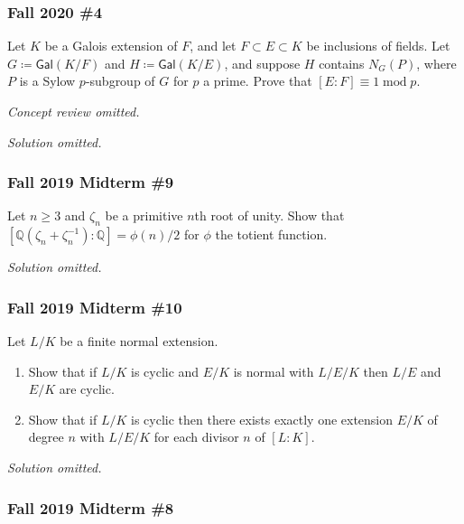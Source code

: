 \hypertarget{fall-2020-4}{%
\subsubsection{Fall 2020 \#4}\label{fall-2020-4}}

Let \(K\) be a Galois extension of \(F\), and let
\(F \subset E \subset K\) be inclusions of fields. Let
\(G \coloneqq{ \mathsf{Gal}} (K/F)\) and
\(H \coloneqq{ \mathsf{Gal}} (K/E)\), and suppose \(H\) contains
\(N_G(P)\), where \(P\) is a Sylow \(p\)-subgroup of \(G\) for \(p\) a
prime. Prove that \([E: F] \equiv 1 \operatorname{mod}p\).

\emph{Concept review omitted.}

\emph{Solution omitted.}

\hypertarget{fall-2019-midterm-9}{%
\subsubsection{Fall 2019 Midterm \#9}\label{fall-2019-midterm-9}}

Let \(n\geq 3\) and \(\zeta_n\) be a primitive \(n\)th root of unity.
Show that
\([{\mathbb{Q}}(\zeta_n + \zeta_n^{-1}): {\mathbb{Q}}] = \phi(n)/2\) for
\(\phi\) the totient function.

\emph{Solution omitted.}

\hypertarget{fall-2019-midterm-10}{%
\subsubsection{Fall 2019 Midterm \#10}\label{fall-2019-midterm-10}}

Let \(L/K\) be a finite normal extension.

\begin{enumerate}
\def\labelenumi{\alph{enumi}.}
\item
  Show that if \(L/K\) is cyclic and \(E/K\) is normal with \(L/E/K\)
  then \(L/E\) and \(E/K\) are cyclic.
\item
  Show that if \(L/K\) is cyclic then there exists exactly one extension
  \(E/K\) of degree \(n\) with \(L/E/K\) for each divisor \(n\) of
  \([L:K]\).
\end{enumerate}

\emph{Solution omitted.}

\hypertarget{fall-2019-midterm-8}{%
\subsubsection{Fall 2019 Midterm \#8}\label{fall-2019-midterm-8}}

